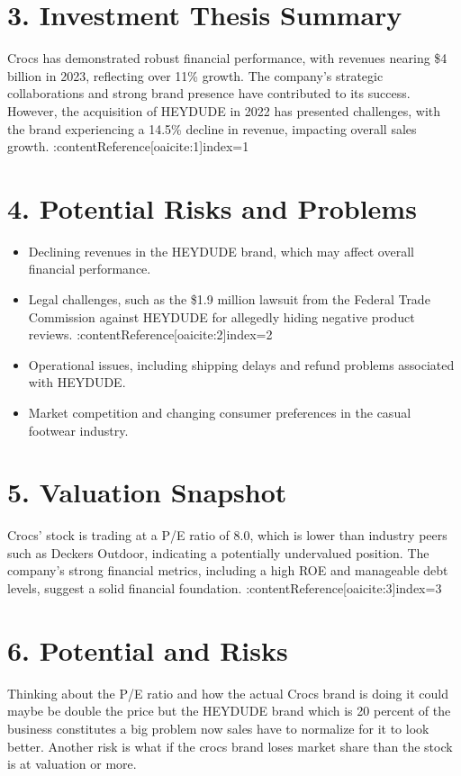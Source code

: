 \documentclass[12pt]{article}
\begin{document}
\section*{3. Investment Thesis Summary}
Crocs has demonstrated robust financial performance, with revenues nearing \$4 billion in 2023, reflecting over 11\% growth. The company's strategic collaborations and strong brand presence have contributed to its success. However, the acquisition of HEYDUDE in 2022 has presented challenges, with the brand experiencing a 14.5\% decline in revenue, impacting overall sales growth. :contentReference[oaicite:1]{index=1}

\section*{4. Potential Risks and Problems}
\begin{itemize}
    \item Declining revenues in the HEYDUDE brand, which may affect overall financial performance.
    \item Legal challenges, such as the \$1.9 million lawsuit from the Federal Trade Commission against HEYDUDE for allegedly hiding negative product reviews. :contentReference[oaicite:2]{index=2}
    \item Operational issues, including shipping delays and refund problems associated with HEYDUDE.
    \item Market competition and changing consumer preferences in the casual footwear industry.
\end{itemize}

\section*{5. Valuation Snapshot}
Crocs' stock is trading at a P/E ratio of 8.0, which is lower than industry peers such as Deckers Outdoor, indicating a potentially undervalued position. The company's strong financial metrics, including a high ROE and manageable debt levels, suggest a solid financial foundation. :contentReference[oaicite:3]{index=3}

\section*{6. Potential and Risks}
Thinking about the P/E ratio and how the actual Crocs brand is doing it could maybe be double the price but the HEYDUDE brand which is 20 percent of the business constitutes a big problem now sales have to normalize for it to look better. Another risk is what if the crocs brand loses market share than the stock is at valuation or more.
\end{document}
